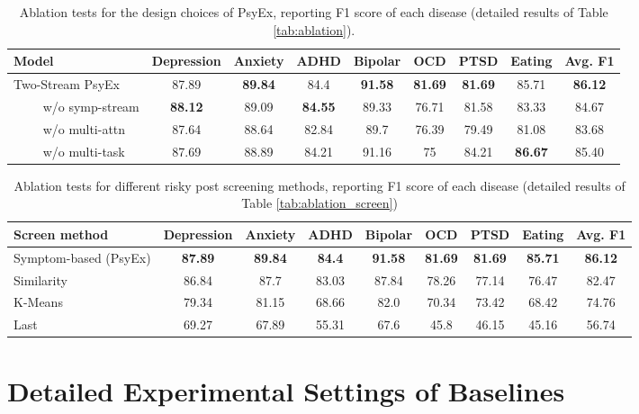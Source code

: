 \begin{table}[th]
    \centering
      \small
    \begin{tabular}{l|ccccccc|c}
    \hline
    Model &  Depression &Anxiety &ADHD &  Bipolar & OCD & PTSD &  Eating & Avg. F1 \\ 
    \hline
    Two-Stream PsyEx &  87.89&	\textbf{89.84}&	84.4&	\textbf{91.58}&	\textbf{81.69}&	\textbf{81.69}&	85.71 & \textbf{86.12}      \\
    ~~~~ w/o symp-stream & \textbf{88.12}&	89.09&	\textbf{84.55}&	89.33&	76.71&	81.58&	83.33 & 84.67 \\
    ~~~~ w/o multi-attn & 87.64&	88.64&	82.84&	89.7&	76.39&	79.49&	81.08 & 83.68       \\
    ~~~~ w/o multi-task & 87.69&	88.89&	84.21&	91.16&	75&	84.21&	\textbf{86.67} & 85.40     \\
    \hline
    \end{tabular}
    \caption{Ablation tests for the design choices of PsyEx, reporting F1 score of each disease (detailed results of Table \ref{tab:ablation}).}
    \label{tab:mdd_by_disease}
\end{table}

\begin{table}[th]
    \centering
    \small
    \begin{tabular}{l|ccccccc|c}
    \hline
    Screen method &  Depression &Anxiety &ADHD &  Bipolar & OCD & PTSD &  Eating & Avg. F1 \\ 
    \hline
    Symptom-based (PsyEx) &  \textbf{87.89}&	\textbf{89.84}&	\textbf{84.4}&	\textbf{91.58}&	\textbf{81.69}&	\textbf{81.69}&	\textbf{85.71} & \textbf{86.12}      \\
    Similarity & 86.84	&87.7	&83.03	&87.84&	78.26&	77.14&	76.47 & 82.47 \\
    K-Means & 79.34	&81.15	&68.66	&82.0&	70.34&	73.42&	68.42 & 74.76\\
    Last & 69.27&	67.89	&55.31	&67.6&	45.8	&46.15	&45.16 & 56.74    \\
    \hline
    \end{tabular}
    \caption{Ablation tests for different risky post screening methods, reporting F1 score of each disease (detailed results of Table \ref{tab:ablation_screen})}
    \label{tab:screen_by_disease}
\end{table}

\section{Detailed Experimental Settings of Baselines}
\label{apd:settings}

